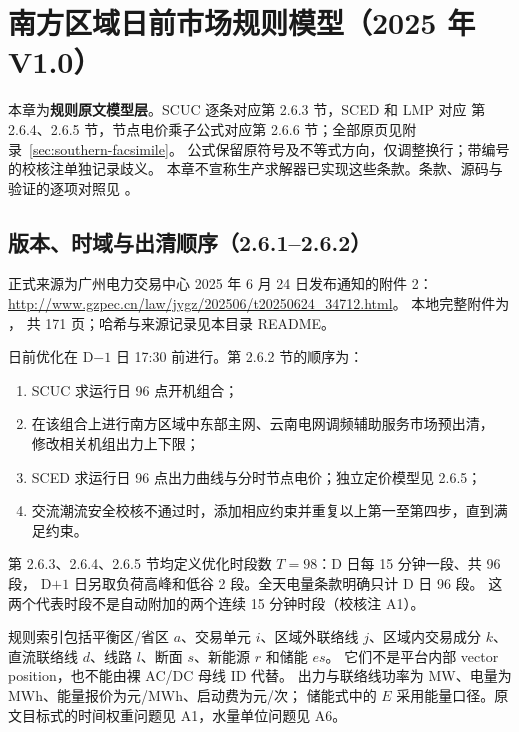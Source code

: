 \section{南方区域日前市场规则模型（2025 年 V1.0）}\label{sec:southern-rule}

\begin{theorynote}
本章为\textbf{规则原文模型层}。SCUC 逐条对应第 2.6.3 节，SCED 和 LMP 对应
第 2.6.4、2.6.5 节，节点电价乘子公式对应第 2.6.6 节；全部原页见附录~\ref{sec:southern-facsimile}。
公式保留原符号及不等式方向，仅调整换行；带编号的校核注单独记录歧义。
本章不宣称生产求解器已实现这些条款。条款、源码与验证的逐项对照见
。
\end{theorynote}

\subsection{版本、时域与出清顺序（2.6.1--2.6.2）}
正式来源为广州电力交易中心 2025 年 6 月 24 日发布通知的附件 2：
\url{http://www.gzpec.cn/law/jygz/202506/t20250624_34712.html}。
本地完整附件为 ，
共 171 页；哈希与来源记录见本目录 README。

日前优化在 D$-1$ 日 17:30 前进行。第 2.6.2 节的顺序为：
\begin{enumerate}
  \item SCUC 求运行日 96 点开机组合；
  \item 在该组合上进行南方区域中东部主网、云南电网调频辅助服务市场预出清，
        修改相关机组出力上下限；
  \item SCED 求运行日 96 点出力曲线与分时节点电价；独立定价模型见 2.6.5；
  \item 交流潮流安全校核不通过时，添加相应约束并重复以上第一至第四步，直到满足约束。
\end{enumerate}
第 2.6.3、2.6.4、2.6.5 节均定义优化时段数 $T=98$：D 日每 15 分钟一段、共 96 段，
D$+1$ 日另取负荷高峰和低谷 2 段。全天电量条款明确只计 D 日 96 段。
这两个代表时段不是自动附加的两个连续 15 分钟时段（校核注 A1）。

规则索引包括平衡区/省区 $a$、交易单元 $i$、区域外联络线 $j$、区域内交易成分 $k$、
直流联络线 $d$、线路 $l$、断面 $s$、新能源 $r$ 和储能 $es$。
它们不是平台内部 vector position，也不能由裸 AC/DC 母线 ID 代替。
出力与联络线功率为 MW、电量为 MWh、能量报价为元/MWh、启动费为元/次；
储能式中的 $E$ 采用能量口径。原文目标式的时间权重问题见 A1，水量单位问题见 A6。

